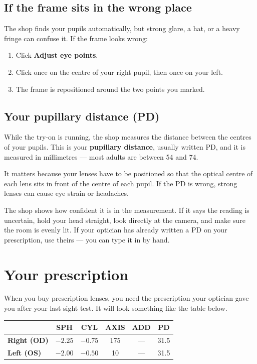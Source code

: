\documentclass[11pt,a4paper]{report}
\newcommand{\btn}[1]{\textbf{#1}}
\begin{document}
\section{If the frame sits in the wrong place}

The shop finds your pupils automatically, but strong glare, a hat, or a
heavy fringe can confuse it. If the frame looks wrong:

\begin{enumerate}
  \item Click \btn{Adjust eye points}.
  \item Click once on the centre of your right pupil, then once on your
        left.
  \item The frame is repositioned around the two points you marked.
\end{enumerate}

\section{Your pupillary distance (PD)}

While the try-on is running, the shop measures the distance between the
centres of your pupils. This is your \textbf{pupillary distance}, usually
written PD, and it is measured in millimetres --- most adults are
between 54 and 74.

It matters because your lenses have to be positioned so that the optical
centre of each lens sits in front of the centre of each pupil. If the PD
is wrong, strong lenses can cause eye strain or headaches.

\begin{tipbox}
The shop shows how confident it is in the measurement. If it says the
reading is uncertain, hold your head straight, look directly at the
camera, and make sure the room is evenly lit. If your optician has
already written a PD on your prescription, use theirs --- you can type
it in by hand.
\end{tipbox}

\chapter{Your prescription}

When you buy prescription lenses, you need the prescription your
optician gave you after your last sight test. It will look something
like the table below.

\begin{center}
\small
\begin{tabular}{@{}lccccc@{}}
\toprule
& \textbf{SPH} & \textbf{CYL} & \textbf{AXIS} & \textbf{ADD} & \textbf{PD} \\
\midrule
\textbf{Right (OD)} & $-2.25$ & $-0.75$ & 175 & --- & 31.5 \\
\textbf{Left (OS)}  & $-2.00$ & $-0.50$ & 10  & --- & 31.5 \\
\bottomrule
\end{tabular}
\end{center}
\end{document}
